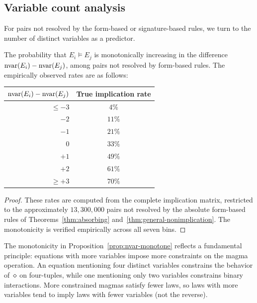 \subsection{Variable count analysis}

For pairs not resolved by the form-based or signature-based rules, we turn to
the number of distinct variables as a predictor.

\begin{proposition}\label{prop:nvar-monotone}
The probability that $E_i \models E_j$ is monotonically increasing in the
difference $\mathrm{nvar}(E_i) - \mathrm{nvar}(E_j)$, among pairs not resolved by form-based
rules.  The empirically observed rates are as follows:
\begin{center}
\begin{tabular}{@{}rc@{}}
\toprule
$\mathrm{nvar}(E_i) - \mathrm{nvar}(E_j)$ & True implication rate \\
\midrule
$\le -3$ & $4\%$ \\
$-2$ & $11\%$ \\
$-1$ & $21\%$ \\
$0$ & $33\%$ \\
$+1$ & $49\%$ \\
$+2$ & $61\%$ \\
$\ge +3$ & $70\%$ \\
\bottomrule
\end{tabular}
\end{center}
\end{proposition}

\begin{proof}
These rates are computed from the complete implication matrix, restricted to
the approximately $13{,}300{,}000$ pairs not resolved by the absolute
form-based rules of Theorems~\ref{thm:absorbing}
and~\ref{thm:general-nonimplication}.  The monotonicity is verified
empirically across all seven bins.
\end{proof}

\begin{remark}\label{rem:nvar-intuition}
The monotonicity in Proposition~\ref{prop:nvar-monotone} reflects a fundamental
principle: equations with more variables impose more constraints on the magma
operation.  An equation mentioning four distinct variables constrains the
behavior of~$\diamond$ on four-tuples, while one mentioning only two variables
constrains binary interactions.  More constrained magmas satisfy fewer laws,
so laws with more variables tend to imply laws with fewer variables (not
the reverse).
\end{remark}

